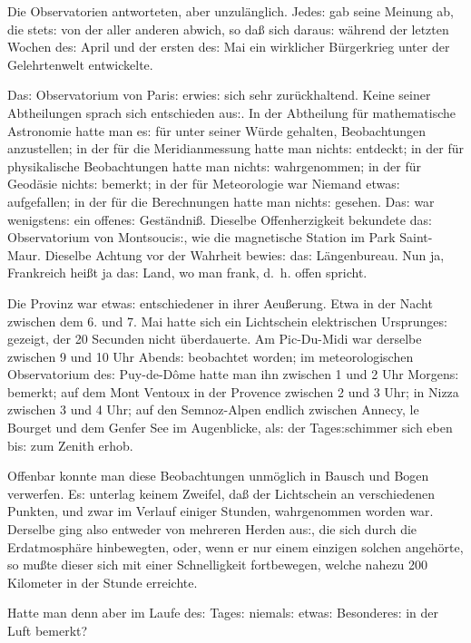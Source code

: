 \documentclass[oneside,12pt]{book}
\newcommand{\s}{s:}
\begin{document}
Die Observatorien antworteten, aber unzul\"anglich. Jede{\s} gab
seine Meinung ab, die stet{\s} von der aller anderen abwich, so
da{\ss} sich darau{\s} w\"ahrend der letzten Wochen de{\s} April und
der ersten de{\s} Mai ein wirklicher B\"urgerkrieg unter der
Gelehrtenwelt entwickelte.

Da{\s} Observatorium von Pari{\s} erwie{\s} sich sehr
zur\"uckhaltend. Keine seiner Abtheilungen sprach sich entschieden
au{\s}. In der Abtheilung f\"ur mathematische Astronomie hatte man
e{\s} f\"ur unter seiner W\"urde gehalten, Beobachtungen anzustellen;
in der f\"ur die Meridianmessung hatte man nicht{\s} entdeckt; in der
f\"ur physikalische Beobachtungen hatte man nicht{\s} wahrgenommen;
in der f\"ur Geod\"asie nicht{\s} bemerkt; in der f\"ur Meteorologie
war Niemand etwa{\s} aufgefallen; in der f\"ur die Berechnungen hatte
man nicht{\s} gesehen. Da{\s} war wenigsten{\s} ein offene{\s}
Gest\"andni{\ss}. Dieselbe Offenherzigkeit bekundete da{\s}
Observatorium von Montsouci{\s}, wie die magnetische Station im Park
Saint-Maur. Dieselbe Achtung vor der Wahrheit bewie{\s} da{\s}
L\"angenbureau. Nun ja, Frankreich hei{\ss}t ja da{\s} Land, wo man
{\glqq}frank{\grqq}, d.~h. offen spricht.

Die Provinz war etwa{\s} entschiedener in ihrer Aeu{\ss}erung. Etwa
in der Nacht zwischen dem 6. und 7. Mai hatte sich ein Lichtschein
elektrischen Ursprunge{\s} gezeigt, der 20 Secunden nicht
\"uberdauerte. Am Pic-Du-Midi war derselbe zwischen 9 und 10 Uhr
Abend{\s} beobachtet worden; im meteorologischen Observatorium de{\s}
Puy-de-D\^ome hatte man ihn zwischen 1 und 2 Uhr Morgen{\s} bemerkt;
auf dem Mont Ventoux in der Provence zwischen 2 und 3 Uhr; in Nizza
zwischen 3 und 4 Uhr; auf den Semnoz-Alpen endlich zwischen Annecy,
le Bourget und dem Genfer See im Augenblicke, al{\s} der
Tage{\s}schimmer sich eben bi{\s} zum Zenith erhob.

Offenbar konnte man diese Beobachtungen unm\"oglich in Bausch und
Bogen verwerfen. E{\s} unterlag keinem Zweifel, da{\ss} der
Lichtschein an verschiedenen Punkten, und zwar im Verlauf einiger
Stunden, wahrgenommen worden war. Derselbe ging also entweder von
mehreren Herden au{\s}, die sich durch die Erdatmosph\"are
hinbewegten, oder, wenn er nur einem einzigen solchen angeh\"orte, so
mu{\ss}te dieser sich mit einer Schnelligkeit fortbewegen, welche
nahezu 200 Kilometer in der Stunde erreichte.

Hatte man denn aber im Laufe de{\s} Tage{\s} niemal{\s} etwa{\s}
Besondere{\s} in der Luft bemerkt?
\end{document}
